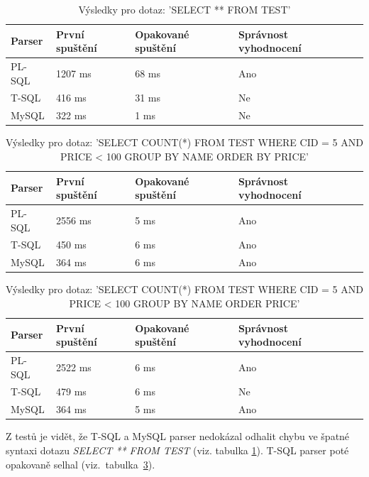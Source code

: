 \documentclass[czech,bachelor,public,dept460,male,cpdeclaration,twoside]{diploma}
\begin{document}
\begin{table}[!htbp]
	\centering
	\caption{Výsledky pro dotaz: 'SELECT ** FROM TEST'}
	\label{tab:antrl2}
	\begin{tabular}{lllll}
		\toprule
		Parser & První spuštění & Opakované spuštění & Správnost vyhodnocení\\
		\midrule
		PL-SQL & 1207 ms & 68 ms & Ano \\
        T-SQL & 416 ms &31 ms & Ne \\
        MySQL & 322 ms & 1 ms & Ne \\
		\midrule
	\end{tabular}
\end{table}

\begin{table}[!htbp]
	\centering
	\caption{Výsledky pro dotaz: 'SELECT COUNT(*) FROM TEST WHERE CID = 5 AND PRICE < 100 GROUP BY NAME ORDER BY PRICE'}
	\label{tab:antrl3}
	\begin{tabular}{lllll}
		\toprule
		Parser & První spuštění & Opakované spuštění & Správnost vyhodnocení\\
		\midrule
		PL-SQL & 2556 ms & 5 ms & Ano \\
        T-SQL & 450 ms & 6 ms & Ano \\
        MySQL & 364 ms & 6 ms & Ano \\
		\midrule
	\end{tabular}
\end{table}

\begin{table}[!htbp]
	\centering
	\caption{Výsledky pro dotaz: 'SELECT COUNT(*) FROM TEST WHERE CID = 5 AND PRICE < 100 GROUP BY NAME ORDER PRICE'}
	\label{tab:antrl4}
	\begin{tabular}{lllll}
		\toprule
		Parser & První spuštění & Opakované spuštění & Správnost vyhodnocení\\
		\midrule
		PL-SQL & 2522 ms & 6 ms & Ano \\
        T-SQL & 479 ms & 6 ms & Ne \\
        MySQL & 364 ms & 5 ms & Ano \\
		\midrule
	\end{tabular}
\end{table}


Z testů je vidět, že T-SQL a MySQL parser nedokázal odhalit chybu ve špatné syntaxi dotazu \textit{SELECT ** FROM TEST} (viz. tabulka \ref{tab:antrl2}). T-SQL parser poté opakovaně selhal (viz.~tabulka~\ref{tab:antrl4}).
\end{document}
